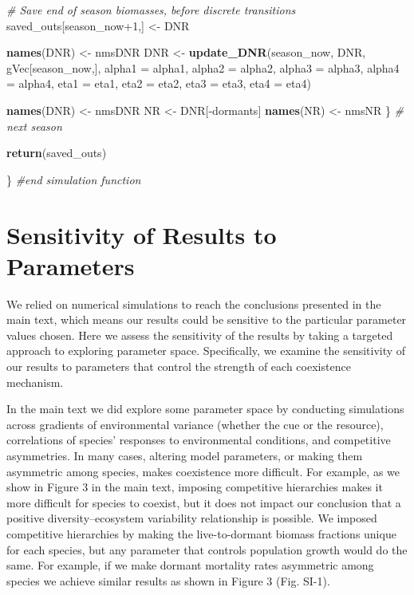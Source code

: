 \documentclass[11pt,]{article}
\newenvironment{Shaded}{\begin{snugshade}}{\end{snugshade}}
\newcommand{\KeywordTok}[1]{\textcolor[rgb]{0.13,0.29,0.53}{\textbf{{#1}}}}
\newcommand{\DataTypeTok}[1]{\textcolor[rgb]{0.13,0.29,0.53}{{#1}}}
\newcommand{\DecValTok}[1]{\textcolor[rgb]{0.00,0.00,0.81}{{#1}}}
\newcommand{\StringTok}[1]{\textcolor[rgb]{0.31,0.60,0.02}{{#1}}}
\newcommand{\CommentTok}[1]{\textcolor[rgb]{0.56,0.35,0.01}{\textit{{#1}}}}
\newcommand{\NormalTok}[1]{{#1}}
\begin{document}
\begin{Shaded}
\begin{Highlighting}[]
    \CommentTok{# Save end of season biomasses, before discrete transitions}
    \NormalTok{saved_outs[season_now}\DecValTok{+1}\NormalTok{,] <-}\StringTok{ }\NormalTok{DNR}
    
    \KeywordTok{names}\NormalTok{(DNR) <-}\StringTok{ }\NormalTok{nmsDNR}
    \NormalTok{DNR        <-}\StringTok{ }\KeywordTok{update_DNR}\NormalTok{(season_now, DNR, gVec[season_now,],}
                             \DataTypeTok{alpha1 =} \NormalTok{alpha1, }\DataTypeTok{alpha2 =} \NormalTok{alpha2, }
                             \DataTypeTok{alpha3 =} \NormalTok{alpha3, }\DataTypeTok{alpha4 =} \NormalTok{alpha4,}
                             \DataTypeTok{eta1 =} \NormalTok{eta1, }\DataTypeTok{eta2 =} \NormalTok{eta2, }\DataTypeTok{eta3 =} \NormalTok{eta3, }\DataTypeTok{eta4 =} \NormalTok{eta4)}
    
    \KeywordTok{names}\NormalTok{(DNR) <-}\StringTok{ }\NormalTok{nmsDNR}
    \NormalTok{NR         <-}\StringTok{ }\NormalTok{DNR[-dormants]  }
    \KeywordTok{names}\NormalTok{(NR)  <-}\StringTok{ }\NormalTok{nmsNR}
  \NormalTok{\} }\CommentTok{# next season}
  
  \KeywordTok{return}\NormalTok{(saved_outs)}
  
\NormalTok{\} }\CommentTok{#end simulation function}
\end{Highlighting}
\end{Shaded}

\newpage{}

\section{Sensitivity of Results to Parameters}

We relied on numerical simulations to reach the conclusions presented in
the main text, which means our results could be sensitive to the
particular parameter values chosen. Here we assess the sensitivity of
the results by taking a targeted approach to exploring parameter space.
Specifically, we examine the sensitivity of our results to parameters
that control the strength of each coexistence mechanism.

In the main text we did explore some parameter space by conducting
simulations across gradients of environmental variance (whether the cue
or the resource), correlations of species' responses to environmental
conditions, and competitive asymmetries. In many cases, altering model
parameters, or making them asymmetric among species, makes coexistence
more difficult. For example, as we show in Figure 3 in the main text,
imposing competitive hierarchies makes it more difficult for species to
coexist, but it does not impact our conclusion that a positive
diversity--ecosystem variability relationship is possible. We imposed
competitive hierarchies by making the live-to-dormant biomass fractions
unique for each species, but any parameter that controls population
growth would do the same. For example, if we make dormant mortality
rates asymmetric among species we achieve similar results as shown in
Figure 3 (Fig. SI-1).
\end{document}
